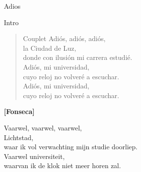 \begin{song}[tango]{Adios}

\begin{instrumental}{Intro}

 \measure{} \measure{} \measure{}  \measure{}    \measure{}  \measure{}  \measure{}  \measure*{}
\end{instrumental}


\begin{verse}{Couplet}
Adiós, adiós, adiós,\\
\chord{}la Ciudad de Luz,\\
donde con ilusión mi carrera estudié.\\
Adiós, mi universidad,\\
cuyo reloj no volveré a escuchar.\\
Adiós, mi universidad,\\
cuyo reloj no volveré a escuchar.\\
\end{verse}
\textbf{[Fonseca]}
\end{song}
\begin{translation}
Vaarwel, vaarwel, vaarwel,\\
Lichtstad,\\
waar ik vol verwachting mijn studie doorliep.\\
Vaarwel universiteit,\\
waarvan ik de klok niet meer horen zal.\\
\end{translation}
